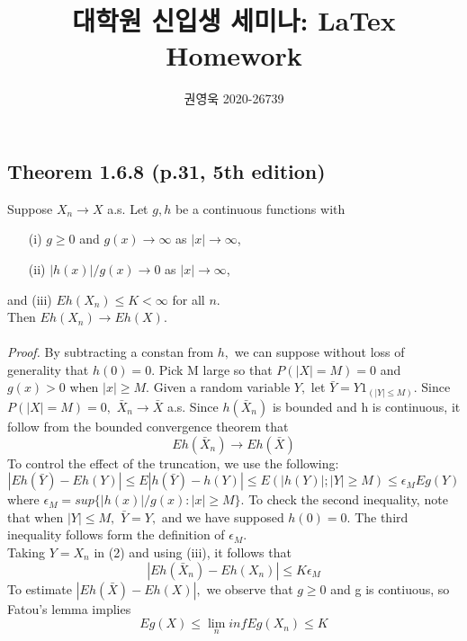 \documentclass[a4paper, 11pt]{article}
\begin{document}
	\title{대학원 신입생 세미나: LaTex Homework}
	\author{권영욱 2020-26739}
	\maketitle
\subsection*{Theorem 1.6.8 (p.31, 5th edition)}	
Suppose $X_n\rightarrow X$ a.s. Let $g, h$ be a continuous functions with
\begin{itemize}
	\item[(i)] $g\ge 0$ and $g(x)\rightarrow \infty$ as $|x|\rightarrow \infty$,
	\item[(ii)] $|h(x)|/g(x)\rightarrow 0$ as $|x|\rightarrow \infty$,
\end{itemize}
and (iii) $Eh(X_n)\le K<\infty$ for all $n.$ \\
Then $Eh(X_n)\rightarrow Eh(X).$ \\
\\
\textit{Proof.}	By subtracting a constan from $h,$ we can suppose without loss of generality that $h(0)=0.$ Pick M large so that $P(|X|=M)=0$ and $g(x)>0$ when $|x|\ge M.$ Given a random variable $Y,$ let $\bar{Y}=Y1_{(|Y|\le M)}.$ Since $P(|X|=M)=0,$ $\bar{X}_{n}\rightarrow \bar{X}$ a.s. Since $h(\bar{X}_{n})$ is bounded and h is continuous, it follow from the bounded convergence theorem that 
\begin{equation}
Eh(\bar{X}_{n})\rightarrow Eh(\bar{X})
\end{equation}
To control the effect of the truncation, we use the following:
\begin{equation}
|Eh(\bar{Y})-Eh(Y)|\le E|h(\bar{Y})-h(Y)|\le E(|h(Y)|;|Y|\ge M) \le \epsilon_{M}Eg(Y)
\end{equation}
where $\epsilon_{M}=sup\{|h(x)|/g(x): |x|\ge M\}.$ To check the second inequality, note that when $|Y|\le M,$ $\bar{Y}=Y,$ and we have supposed $h(0)=0.$ The third inequality follows form the definition of $\epsilon_{M}.$ \\
Taking $Y=X_{n}$ in (2) and using (iii), it follows that 
\begin{equation}
|Eh(\bar{X}_{n})-Eh(X_n)|\le K\epsilon_{M}
\end{equation}
To estimate $|Eh(\bar{X})-Eh(X)|,$ we observe that $g\ge 0$ and g is contiuous, so Fatou's lemma implies
\begin{equation*}
Eg(X)\le \lim_{n}inf Eg(X_n)\le K
\end{equation*}
\end{document}
